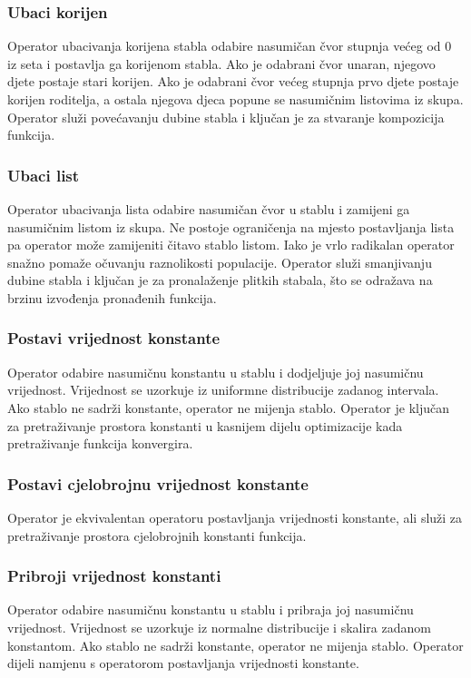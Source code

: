 \documentclass[times, utf8, numeric, diplomski]{fer}
\begin{document}
\subsubsection{Ubaci korijen}
Operator ubacivanja korijena stabla odabire nasumičan čvor stupnja većeg od 0 iz seta i postavlja ga korijenom stabla. Ako je odabrani čvor unaran, njegovo djete postaje stari korijen. Ako je odabrani čvor većeg stupnja prvo djete postaje korijen roditelja, a ostala njegova djeca popune se nasumičnim listovima iz skupa. Operator služi povećavanju dubine stabla i ključan je za stvaranje kompozicija funkcija.

\subsubsection{Ubaci list}
Operator ubacivanja lista odabire nasumičan čvor u stablu i zamijeni ga nasumičnim listom iz skupa. Ne postoje ograničenja na mjesto postavljanja lista pa operator može zamijeniti čitavo stablo listom. Iako je vrlo radikalan operator snažno pomaže očuvanju raznolikosti populacije. Operator služi smanjivanju dubine stabla i ključan je za pronalaženje plitkih stabala, što se odražava na brzinu izvođenja pronađenih funkcija.

\subsubsection{Postavi vrijednost konstante}
Operator odabire nasumičnu konstantu u stablu i dodjeljuje joj nasumičnu vrijednost. Vrijednost se uzorkuje iz uniformne distribucije zadanog intervala. Ako stablo ne sadrži konstante, operator ne mijenja stablo. Operator je ključan za pretraživanje prostora konstanti u kasnijem dijelu optimizacije kada pretraživanje funkcija konvergira.

\subsubsection{Postavi cjelobrojnu vrijednost konstante}
Operator je ekvivalentan operatoru postavljanja vrijednosti konstante, ali služi za pretraživanje prostora cjelobrojnih konstanti funkcija.

\subsubsection{Pribroji vrijednost konstanti}
Operator odabire nasumičnu konstantu u stablu i pribraja joj nasumičnu vrijednost. Vrijednost se uzorkuje iz normalne distribucije i skalira zadanom konstantom. Ako stablo ne sadrži konstante, operator ne mijenja stablo. Operator dijeli namjenu s operatorom postavljanja vrijednosti konstante.
\end{document}
